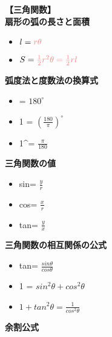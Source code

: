 \documentclass{article}
\begin{document}
\textbf{【三角関数】}\\
\textbf{扇形の弧の長さと面積}
\begin{itemize}
    \item \(l = \textcolor[rgb]{1,0.5,0.5}{r\theta}\)
    \item \(S = \textcolor[rgb]{1,0.5,0.5}{\frac{1}{2}r^2\theta = \frac{1}{2}rl}\)
\end{itemize}
\textbf{弧度法と度数法の換算式}
\begin{itemize}
    \item \pi = \textcolor[rgb]{1,0.5,0.5}{\( 180^\circ \)}
    \item  1 = \textcolor[rgb]{1,0.5,0.5}{\((\frac{180}{\pi})^\circ\)}
    \item 1^\circ = \textcolor[rgb]{1,0.5,0.5}{\(\frac{\pi}{180}\)}
\end{itemize}
\textbf{三角関数の値}
\begin{itemize}
    \item sin\theta = \textcolor[rgb]{1,0.5,0.5}{\(\frac{y}{r}\)}
    \item cos\theta = \textcolor[rgb]{1,0.5,0.5}{\(\frac{x}{r}\)} 
    \item tan\theta = \textcolor[rgb]{1,0.5,0.5}{\(\frac{y}{x}\)}
\end{itemize}
\textbf{三角関数の相互関係の公式}
\begin{itemize}
    \item tan\theta = \textcolor[rgb]{1,0.5,0.5}{\(\frac{sin\theta}{cos\theta}\)}
    \item 1 = \textcolor[rgb]{1,0.5,0.5}{\(sin^2\theta+cos^2\theta\)}
    \item \textcolor[rgb]{1,0.5,0.5}{\(1+tan^2\theta=\frac{1}{cos^2\theta}\)}
\end{itemize}
\textbf{余割公式}
\end{document}
